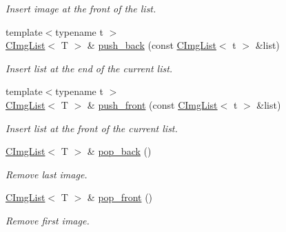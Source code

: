 \begin{Indent}
\begin{DoxyCompactItemize}
\begin{DoxyCompactList}\small\item\em Insert image at the front of the list. \end{DoxyCompactList}\item 
{\footnotesize template$<$typename t $>$ }\\\hyperlink{structcimg__library__suffixed_1_1CImgList}{C\+Img\+List}$<$ T $>$ \& \hyperlink{structcimg__library__suffixed_1_1CImgList_a1ea56fb5e0860f360b3ccfce50ae71e0}{push\+\_\+back} (const \hyperlink{structcimg__library__suffixed_1_1CImgList}{C\+Img\+List}$<$ t $>$ \&list)
\begin{DoxyCompactList}\small\item\em Insert list at the end of the current list. \end{DoxyCompactList}\item 
{\footnotesize template$<$typename t $>$ }\\\hyperlink{structcimg__library__suffixed_1_1CImgList}{C\+Img\+List}$<$ T $>$ \& \hyperlink{structcimg__library__suffixed_1_1CImgList_a6091c1fd9d03ada9ec3ba8ed92f5bcd2}{push\+\_\+front} (const \hyperlink{structcimg__library__suffixed_1_1CImgList}{C\+Img\+List}$<$ t $>$ \&list)
\begin{DoxyCompactList}\small\item\em Insert list at the front of the current list. \end{DoxyCompactList}\item 
\mbox{\label{structcimg__library__suffixed_1_1CImgList_ac619bd8222ff38259b6f891ae3f646bb}} 
\hyperlink{structcimg__library__suffixed_1_1CImgList}{C\+Img\+List}$<$ T $>$ \& \hyperlink{structcimg__library__suffixed_1_1CImgList_ac619bd8222ff38259b6f891ae3f646bb}{pop\+\_\+back} ()
\begin{DoxyCompactList}\small\item\em Remove last image. \end{DoxyCompactList}\item 
\mbox{\label{structcimg__library__suffixed_1_1CImgList_afb5883af31042787f25c35c9d044de6e}} 
\hyperlink{structcimg__library__suffixed_1_1CImgList}{C\+Img\+List}$<$ T $>$ \& \hyperlink{structcimg__library__suffixed_1_1CImgList_afb5883af31042787f25c35c9d044de6e}{pop\+\_\+front} ()
\begin{DoxyCompactList}\small\item\em Remove first image. \end{DoxyCompactList}\item 

\end{DoxyCompactItemize}
\end{Indent}
